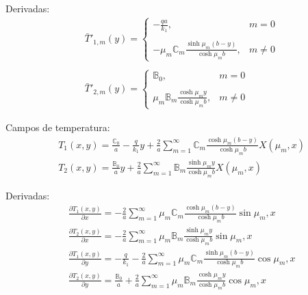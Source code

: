 Derivadas:
\begin{align}
& \bar{T}'_{1,m}(y) = \left\lbrace
\begin{array}{ll}
-\displaystyle \frac{qa}{k_1}, & m = 0 \\ \\
-\displaystyle\mu_m\mathbb{C}_m\frac{\sinh\mu_m (b - y)}{\cosh\mu_m b}, & m \ne 0
\end{array}
\right .
\\ \nonumber \\
& \bar{T}'_{2,m}(y) = \left\lbrace
\begin{array}{ll}
\mathbb{B}_0, & m = 0 \\ \\
\displaystyle\mu_m\mathbb{B}_m\frac{\cosh\mu_m y}{\cosh\mu_m b} , & m \ne 0
\end{array}
\right .
\end{align} 

Campos de temperatura:
\begin{align}
& T_1(x, y) = \frac{\mathbb{C}_0}{a} - \frac{q}{k_1} y + \frac{2}{a}\sum_{m=1}^\infty \mathbb{C}_m\frac{\cosh\mu_m (b - y)}{\cosh\mu_m b}X(\mu_m, x) \\
& T_2(x, y) = \frac{\mathbb{B}_0}{a}y + \frac{2}{a}\sum_{m=1}^\infty\mathbb{B}_m\frac{\sinh\mu_m y}{\cosh\mu_m b} X(\mu_m, x)
\end{align}

Derivadas:
\begin{align}
& \frac{\partial T_1(x, y)}{\partial x} = -\frac{2}{a}\sum_{m=1}^\infty \mu_m\mathbb{C}_m\frac{\cosh\mu_m (b - y)}{\cosh\mu_m b}\sin\mu_m, x \\
& \frac{\partial T_2(x, y)}{\partial x} = -\frac{2}{a}\sum_{m=1}^\infty\mu_m\mathbb{B}_m\frac{\sinh\mu_m y}{\cosh\mu_m b} \sin\mu_m, x \\
& \frac{\partial T_1(x, y)}{\partial y} = - \frac{q}{k_1} - \frac{2}{a}\sum_{m=1}^\infty \mu_m\mathbb{C}_m\frac{\sinh\mu_m (b - y)}{\cosh\mu_m b}\cos\mu_m, x\\ 
& \frac{\partial T_2(x, y)}{\partial y} = \frac{\mathbb{B}_0}{a} + \frac{2}{a}\sum_{m=1}^\infty\mu_m\mathbb{B}_m\frac{\cosh\mu_m y}{\cosh\mu_m b} \cos\mu_m, x
\end{align}

